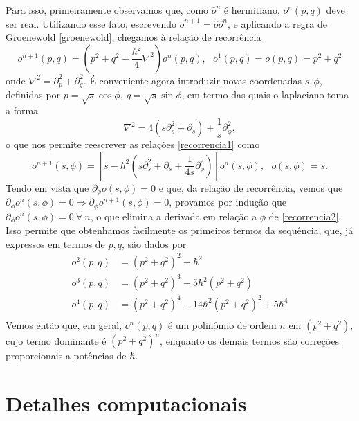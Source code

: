 \documentclass[
	12pt,
	oneside,			%
	a4paper,			%
	english,			%
	brazil				%
	]{abntex2}
\theoremstyle{definition}
\begin{document}
\begin{apendicesenv}
Para isso, primeiramente observamos que, como $\hat{o}^n$ é hermitiano, $o^n(p,q)$ deve ser real. Utilizando esse fato, escrevendo $\hat{o}^{n+1} = \hat{o} \hat{o}^{n}$, e aplicando a regra de Groenewold \eqref{groenewold}, chegamos à relação de recorrência
\begin{equation}
\label{recorrencia1}
    o^{n+1}(p,q) = \left( p^2+q^2 - \frac{\hbar^2}{4}\nabla^2 \right)o^n(p,q), \ \ \ o^1(p,q) = o(p,q) = p^2+q^2
\end{equation}
onde $\nabla^2 = \partial_p^2 + \partial_q^2$. É conveniente agora introduzir novas coordenadas $s,\phi$, definidas por $p = \sqrt{s} \cos \phi, \ q = \sqrt{s} \sin \phi$, em termo das quais o laplaciano toma a forma
\begin{equation}
    \nabla^2 = 4 \left( s \partial_s^2 + \partial_s \right) + \frac{1}{s}\partial_\phi^2,
\end{equation}
o que nos permite reescrever as relações \eqref{recorrencia1} como
\begin{equation}
\label{recorrencia2}
    o^{n+1}(s,\phi) = \left[ s - \hbar^2\left( s \partial_s^2 + \partial_s +\frac{1}{4s}\partial_\phi^2\right) \right]o^n(s,\phi), \ \ \ o(s,\phi) = s.
\end{equation}
Tendo em vista que $\partial_\phi o(s,\phi) = 0$ e que, da relação de recorrência, vemos que $\partial_\phi o^n(s,\phi) = 0 \Rightarrow \partial_\phi o^{n+1}(s,\phi) = 0$, provamos por indução que $\partial_\phi o^n(s,\phi) = 0 \ \forall \ n$, o que elimina a derivada em relação a $\phi$ de \eqref{recorrencia2}. Isso permite que obtenhamos facilmente os primeiros termos da sequência, que, já expressos em termos de $p,q$, são dados por
\begin{equation}
\label{wigner para potencias de p2 + q2}
    \begin{aligned}
        o^2(p,q) &= \left( p^2 + q^2 \right)^2 - \hbar^2 \\
        o^3(p,q) &= \left( p^2 + q^2 \right)^3 - 5\hbar^2\left( p^2 + q^2 \right) \\
        o^4(p,q) &= \left( p^2 + q^2 \right)^4 - 14\hbar^2\left( p^2 + q^2 \right)^2 + 5 \hbar^4 \\
    \end{aligned}
\end{equation}
Vemos então que, em geral, $o^n(p,q)$ é um polinômio de ordem $n$ em $(p^2+q^2)$, cujo termo dominante é $(p^2+q^2)^n$, enquanto os demais termos são correções proporcionais a potências de $\hbar$.

\chapter{Detalhes computacionais}


\end{apendicesenv}
\end{document}
